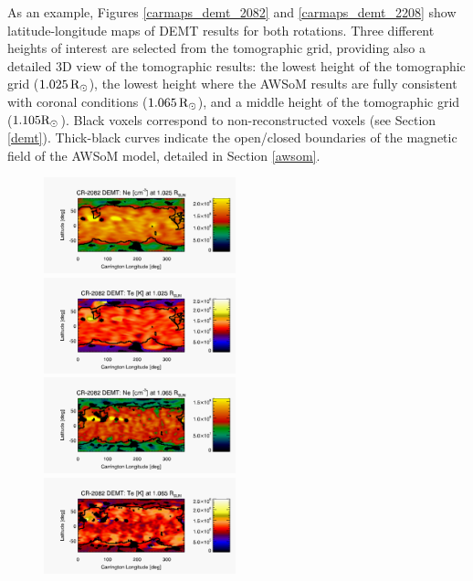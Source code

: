 \documentclass[namedreferences]{solarphysics}
\newcommand{\mrsun}{{\rm R_\odot}}
\begin{document}
\begin{article}
{As an example,} Figures \ref{carmaps_demt_2082} and \ref{carmaps_demt_2208} show {latitude-longitude} maps of DEMT results for both {rotations. Three different heights {of interest are selected from the tomographic grid}, providing also a detailed 3D view of the tomographic results: the lowest height of {the} tomographic grid ($1.025\,\mrsun$), {the lowest height where the AWSoM results are fully} consistent with coronal conditions ($1.065\,\mrsun$), and a middle height of the tomographic grid ($1.105\mrsun$)}. Black voxels correspond to non-reconstructed voxels ({see} Section \ref{demt}). Thick-black {curves indicate} the {open/closed boundaries of the magnetic field of the} AWSoM model{, detailed in Section \ref{awsom}.} 

\begin{figure}[h!]
\begin{center}
\includegraphics[width=0.495\textwidth]{figs/map_Ne_CR2082_DEMT-EUVI_behind_H1-L3523_r3d_1025_Rsun.pdf}
\includegraphics[width=0.495\textwidth]{figs/map_Tm_CR2082_DEMT-EUVI_behind_H1-L3523_r3d_1025_Rsun.pdf}
\includegraphics[width=0.495\textwidth]{figs/map_Ne_CR2082_DEMT-EUVI_behind_H1-L3523_r3d_1065_Rsun.pdf}
\includegraphics[width=0.495\textwidth]{figs/map_Tm_CR2082_DEMT-EUVI_behind_H1-L3523_r3d_1065_Rsun.pdf}

\end{center}
\end{figure}
\end{article}
\end{document}
